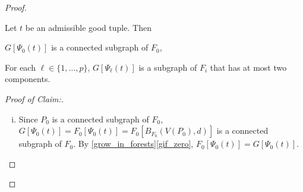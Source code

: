 \documentclass{patmorin}
\newcommand{\pat}[1]{\textcolor{Blue}{Pat: #1}}
\newcommand{\piotr}[1]{\textcolor{red}{Piotr: #1}}
\newenvironment{clmproof}{\begin{proof}[Proof of Claim:]\renewcommand{\qedsymbol}{\rule{1ex}{1ex}}}{\end{proof}}
\begin{document}
\begin{proof}
\begin{clm}
Let $t$ be an admissible good tuple. Then
\begin{compactenum}[(i)]
\item $G[\Psi_0(t)]$ is a connected subgraph of $F_0$,
\item For each $\ell\in\{1,\ldots,p\}$, $G[\Psi_\ell(t)]$ is a subgraph of $F_i$ that has at most two components.

\end{compactenum}
\end{clm}

\begin{clmproof}\
  \begin{enumerate}[(i)]
    \item Since $P_0$ is a connected subgraph of $F_0$, $G[\Psi_0(t)]=F_0[\Psi_0(t)]=F_0[B_{F_0}(V(P_0),d)]$ is a connected subgraph of $F_0$.  By \cref{grow_in_forests}\cref{gif_zero}, $F_0[\Psi_0(t)]=G[\Psi_0(t)]$.


\end{enumerate}
\end{clmproof}
\end{proof}
\end{document}
